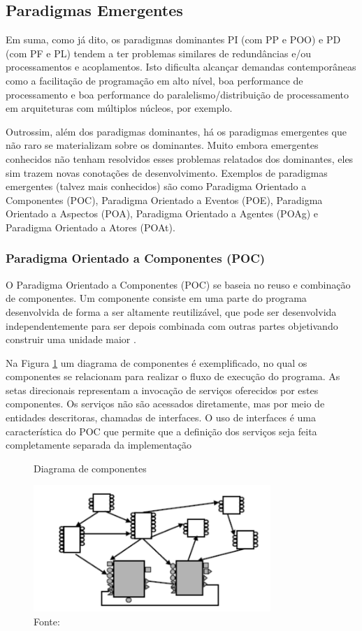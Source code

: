 \subsection{Paradigmas Emergentes}

Em suma, como já dito, os paradigmas dominantes PI (com PP e POO) e PD (com PF e
PL) tendem a ter problemas similares de redundâncias e/ou processamentos e
acoplamentos. Isto dificulta alcançar demandas contemporâneas como a facilitação
de programação em alto nível, boa performance de processamento e boa performance
do paralelismo/distribuição de processamento em arquiteturas com múltiplos
núcleos, por exemplo. 

Outrossim, além dos paradigmas dominantes, há os paradigmas emergentes que não
raro se materializam sobre os dominantes. Muito embora emergentes conhecidos não
tenham resolvidos esses problemas relatados dos dominantes, eles sim trazem
novas conotações de desenvolvimento. Exemplos de paradigmas emergentes (talvez
mais conhecidos) são como Paradigma Orientado a Componentes (POC), Paradigma
Orientado a Eventos (POE), Paradigma Orientado a Aspectos (POA), Paradigma
Orientado a Agentes (POAg) e Paradigma Orientado a Atores (POAt).


\subsubsection{Paradigma Orientado a Componentes (POC)}

O Paradigma Orientado a Componentes (POC) se baseia no reuso e combinação de
componentes. Um componente consiste em uma parte do programa desenvolvida de
forma a ser altamente reutilizável, que pode ser desenvolvida independentemente
para ser depois combinada com outras partes objetivando construir uma unidade
maior \cite{dsouza_1998}.

Na Figura \ref{fig:componentes} um diagrama de componentes é exemplificado, no
qual os componentes se relacionam para realizar o fluxo de execução do programa.
As setas direcionais representam a invocação de serviços oferecidos por estes
componentes. Os serviços não são acessados diretamente, mas por meio de
entidades descritoras, chamadas de interfaces. O uso de interfaces é uma
característica do POC que permite que a definição dos serviços seja feita
completamente separada da implementação \cite{crnkovic_2002}

\begin{figure}[!htb]
  \centering
  \caption{Diagrama de componentes}
  \includegraphics[width=0.8\textwidth]{../figures/componentes.png}
  \caption*{Fonte: }
  \label{fig:componentes}
\end{figure}

